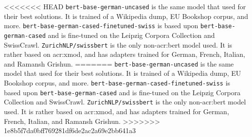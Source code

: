 <<<<<<< HEAD
\texttt{bert-base-german-uncased} is the same model that \cite{scherrerHeLjuVarDial20202020} used for their best solutions. It is trained of a Wikipedia dump, EU Bookshop corpus, and more. \texttt{bert-base-german-cased-finetuned-swiss} is based upon \texttt{bert-base-german-cased} and is fine-tuned on the Leipzig Corpora Collection and SwissCrawl. \texttt{ZurichNLP/swissbert} is the only non-\acrshort{acr:bert} model used. It is rather based on \acrshort{acr:xmod}, and has adapters trained for German, French, Italian, and Ramansh Grishun.
=======
\texttt{bert-base-german-uncased} \citep{DbmdzBertbasegermanuncasedHugging} is the same model that \cite{scherrerHeLjuVarDial20202020} used for their best solutions. It is trained of a Wikipedia dump, EU Bookshop corpus, and more. \texttt{bert-base-german-cased-finetuned-swiss} is based upon \texttt{bert-base-german-cased} and is fine-tuned on the Leipzig Corpora Collection and SwissCrawl. \texttt{ZurichNLP/swissbert} is the only non-\acrshort{acr:bert} model used. It is rather based on \acrshort{acr:xmod}, and has adapters trained for German, French, Italian, and Ramansh Grishun.
>>>>>>> 1e8b5f7da0bff769281df6de2ac2a69e2bb641a3

